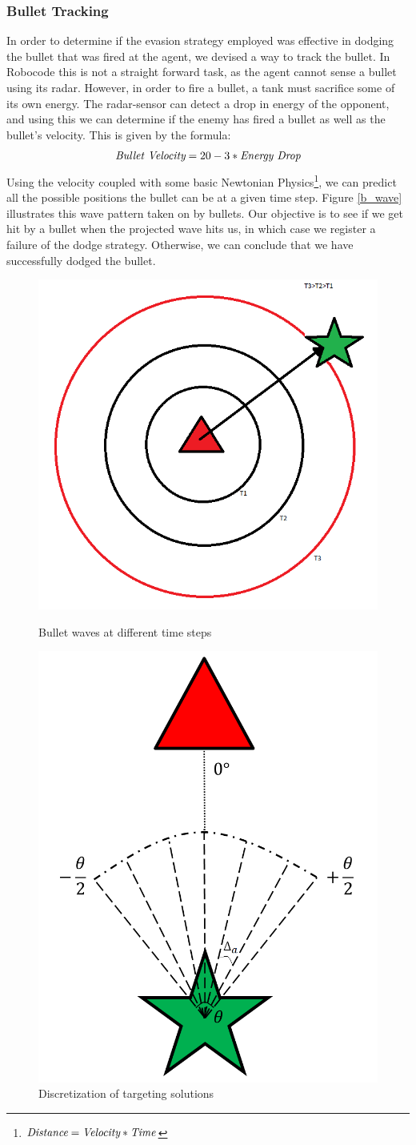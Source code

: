 \documentclass{article}
\theoremstyle{plain}
\theoremstyle{definition}
\theoremstyle{remark}
\begin{document}
\subsubsection*{Bullet Tracking}
In order to determine if the evasion strategy employed was effective in dodging the bullet that was fired at the agent, we devised a way to track the bullet. In Robocode this is not a straight forward task, as the agent cannot sense a bullet using its radar. However, in order to fire a bullet, a tank must sacrifice some of its own energy. The radar-sensor can detect a drop in energy of the opponent, and using this we can determine if the enemy has fired a bullet as well as the bullet's velocity. This is given by the formula:
$$\emph{Bullet Velocity} = 20 - 3 * \emph{Energy Drop}$$
Using the velocity coupled with some basic Newtonian Physics\footnote{$\emph{Distance} = \emph{Velocity} * \emph{Time}$}, we can predict all the possible positions the bullet can be at a given time step.
Figure \ref{b_wave} illustrates this wave pattern taken on by bullets. Our objective is to see if we get hit by a bullet when the projected wave hits us, in which case we register a failure of the dodge strategy. Otherwise, we can conclude that we have successfully dodged the bullet.

\begin{figure}[h]
\begin{minipage}[b]{0.5\linewidth}
	\centering
		\includegraphics[width=5 cm]{bullet_wave.png}
	\caption{Bullet waves at different time steps}
	\label{b_wave}
\end{minipage}
\hspace{0.5cm}
\begin{minipage}[b]{0.5\linewidth}
\centering
		\includegraphics[width=5 cm]{targeting.png}
	\caption{Discretization of targeting solutions}
	\label{tget}
\end{minipage}
\end{figure}
\end{document}
